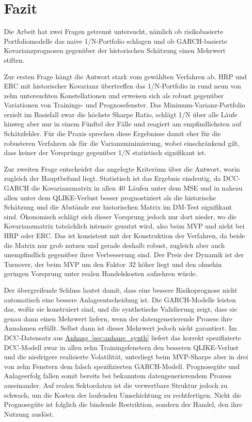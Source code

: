 \documentclass[12pt,a4paper]{article}
\begin{document}
\section{Fazit}\label{sec:fazit}
Die Arbeit hat zwei Fragen getrennt untersucht, nämlich ob risikobasierte Portfoliomodelle das naive 1/N-Portfolio schlagen und ob GARCH-basierte Kovarianzprognosen gegenüber der historischen Schätzung einen Mehrwert stiften.

Zur ersten Frage hängt die Antwort stark vom gewählten Verfahren ab.
HRP und ERC mit historischer Kovarianz übertreffen das 1/N-Portfolio in rund neun von zehn untersuchten Konstellationen und erweisen sich als robust gegenüber Variationen von Trainings- und Prognosefenster.
Das Minimum-Varianz-Portfolio erzielt im Basisfall zwar die höchste Sharpe Ratio, schlägt 1/N über alle Läufe hinweg aber nur in einem Fünftel der Fälle und reagiert am empfindlichsten auf Schätzfehler.
Für die Praxis sprechen diese Ergebnisse damit eher für die robusteren Verfahren als für die Varianzminimierung, wobei einschränkend gilt, dass keiner der Vorsprünge gegenüber 1/N statistisch signifikant ist.

Zur zweiten Frage entscheidet das angelegte Kriterium über die Antwort, worin zugleich der Hauptbefund liegt.
Statistisch ist das Ergebnis eindeutig, da DCC-GARCH die Kovarianzmatrix in allen 40~Läufen unter dem MSE und in nahezu allen unter dem QLIKE-Verlust besser prognostiziert als die historische Schätzung und die Abstände zur historischen Matrix im DM-Test signifikant sind.
Ökonomisch schlägt sich dieser Vorsprung jedoch nur dort nieder, wo die Kovarianzmatrix tatsächlich intensiv genutzt wird, also beim MVP und nicht bei HRP oder ERC.
Das ist konsistent mit der Konstruktion der Verfahren, da beide die Matrix nur grob nutzen und gerade deshalb robust, zugleich aber auch unempfindlich gegenüber ihrer Verbesserung sind.
Der Preis der Dynamik ist der Turnover, der beim MVP um den Faktor~32 höher liegt und den ohnehin geringen Vorsprung unter realen Handelskosten aufzehren würde.

Der übergreifende Schluss lautet damit, dass eine bessere Risikoprognose nicht automatisch eine bessere Anlageentscheidung ist.
Die GARCH-Modelle leisten das, wofür sie konstruiert sind, und die synthetische Validierung zeigt, dass sie genau dann einen Mehrwert liefern, wenn der datengenerierende Prozess ihre Annahmen erfüllt.
Selbst dann ist dieser Mehrwert jedoch nicht garantiert.
Im DCC-Datensatz aus \hyperref[sec:anhang_synth]{Anhang~\ref*{sec:anhang_synth}} liefert das korrekt spezifizierte DCC-Modell zwar in allen zehn Trainingsfenstern den besseren QLIKE-Verlust und die niedrigere realisierte Volatilität, unterliegt beim MVP-Sharpe aber in drei von zehn Fenstern dem falsch spezifizierten GARCH-Modell.
Prognosegüte und Anlageerfolg fallen somit bereits bei bekanntem datengenerierendem Prozess auseinander.
Auf realen Sektordaten ist die verwertbare Struktur jedoch zu schwach, um die Kosten der laufenden Umschichtung zu rechtfertigen.
Nicht die Prognosegüte ist folglich die bindende Restriktion, sondern der Handel, den ihre Nutzung auslöst.
\end{document}
